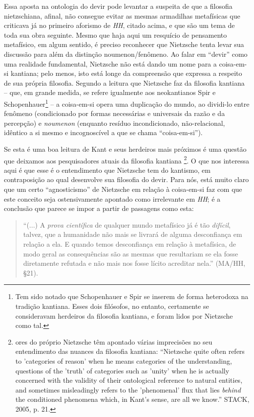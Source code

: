\documentclass[
	12pt,				%
	openright,			%
	oneside,			%
	a4paper,			%
	english,			%
	french,				%
	spanish,			%
	brazil				%
	]{abntex2}
\begin{document}
Essa aposta na ontologia do devir pode levantar a suspeita de que a filosofia nietzschiana, afinal, não consegue evitar as mesmas armadilhas metafísicas que criticava já no primeiro aforismo de \textit{HH}, citado acima, e que são um tema de toda sua obra seguinte. Mesmo que haja aqui um resquício de pensamento metafísico, em algum sentido, é preciso reconhecer que Nietzsche tenta levar sua discussão para além da distinção noumenon/fenômeno. Ao falar em “devir” como uma realidade fundamental, Nietzsche não está dando um nome para a coisa-em-si kantiana; pelo menos, isto está longe da compreensão que expressa a respeito de sua própria filosofia. Segundo a leitura que Nietzsche faz da filosofia kantiana – que, em grande medida, se refere igualmente aos neokantianos Spir e Schopenhauer\footnote{Tem sido notado que Schopenhauer e Spir se inserem de forma heterodoxa na tradição kantiana. Esses dois filósofos, no entanto, certamente se consideravam herdeiros da filosofia kantiana, e foram lidos por Nietzsche como tal.} – a coisa-em-si opera uma duplicação do mundo, ao dividi-lo entre fenômeno (condicionado por formas necessárias e universais da razão e da percepção) e \textit{noumenon} (enquanto resíduo incondicionado, não-relacional, idêntico a si mesmo e incognoscível a que se chama “coisa-em-si”). 

Se esta é uma boa leitura de Kant e seus herdeiros mais próximos é uma questão que deixamos aos pesquisadores atuais da filosofia kantiana
\footnote{ores do próprio Nietzsche têm apontado várias imprecisões no seu entendimento das nuances da filosofia kantiana: “Nietzsche quite often refers to 'categories of reason' when he means categories of the understanding, questions of the 'truth' of categories such as 'unity' when he is actually concerned with the validity of their ontological reference to natural entities, and sometimes misleadingly refers to the 'phenomenal' flux that lies \textit{behind} the conditioned phenomena which, in Kant's sense, are all we know.” STACK, 2005, p. 21. }.
 O que nos interessa aqui é que esse é o entendimento que Nietzsche tem do kantismo, em contraposição ao qual desenvolve sua filosofia do devir. Para nós, está muito claro que um certo “agnosticismo” de Nietzsche em relação à coisa-em-si faz com que este conceito seja ostensivamente apontado como irrelevante em \textit{HH}; é a conclusão que parece se impor a partir de passagens como esta: 

\begin{quotation}
“(...) A \textit{prova científica} de qualquer mundo metafísico já é tão \textit{difícil}, talvez, que a humanidade não mais se livrará de alguma desconfiança em relação a ela. E quando temos desconfiança em relação à metafísica, de modo geral as consequências são as mesmas que resultariam se ela fosse diretamente refutada e não mais nos fosse lícito acreditar nela.” (MA/HH, §21). 
\end{quotation}
\end{document}
